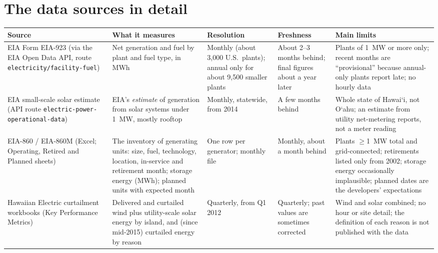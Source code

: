 \documentclass[11pt,a4paper]{article}
\newcommand{\okina}{\textquoteleft}
\newcommand{\Oahu}{\texorpdfstring{O\okina ahu}{Oahu}}
\newcommand{\Hawaii}{\texorpdfstring{Hawai\okina i}{Hawaii}}
\newcommand{\code}[1]{\nolinkurl{#1}}      %
\begin{document}
\section{The data sources in detail}
\label{sec:sources}

\begin{table}[htbp]
\centering\footnotesize
\begin{tabularx}{\textwidth}{@{}>{\raggedright\arraybackslash}p{2.5cm}>{\raggedright\arraybackslash}p{3.3cm}>{\raggedright\arraybackslash}p{2.5cm}>{\raggedright\arraybackslash}p{2.3cm}X@{}}
\toprule
Source & What it measures & Resolution & Freshness & Main limits \\
\midrule
EIA Form EIA-923 (via the EIA Open Data API, route \code{electricity/facility-fuel}) &
 Net generation and fuel by plant and fuel type, in MWh &
 Monthly (about 3,000 U.S.\ plants); annual only for about 9,500 smaller plants &
 About 2--3 months behind; final figures about a year later &
 Plants of 1~MW or more only; recent months are ``provisional'' because annual-only plants report late; no hourly data \\
\addlinespace
EIA small-scale solar estimate (API route \texttt{electric-power-\allowbreak operational-data}) &
 EIA's \emph{estimate} of generation from solar systems under 1~MW, mostly rooftop &
 Monthly, statewide, from 2014 &
 A few months behind &
 Whole state of \Hawaii, not \Oahu; an estimate from utility net-metering reports, not a meter reading \\
\addlinespace
EIA-860 / EIA-860M (Excel; Operating, Retired and Planned sheets) &
 The inventory of generating units: size, fuel, technology, location, in-service and retirement month; storage energy (MWh); planned units with expected month &
 One row per generator; monthly file &
 Monthly, about a month behind &
 Plants $\geq$1~MW total and grid-connected; retirements listed only from 2002; storage energy occasionally implausible; planned dates are the developers' expectations \\
\addlinespace
Hawaiian Electric curtailment workbooks (Key Performance Metrics) &
 Delivered and curtailed wind plus utility-scale solar energy by island, and (since mid-2015) curtailed energy by reason &
 Quarterly, from Q1 2012 &
 Quarterly; past values are sometimes corrected &
 Wind and solar combined; no hour or site detail; the definition of each reason is not published with the data \\

\end{tabularx}
\end{table}
\end{document}
